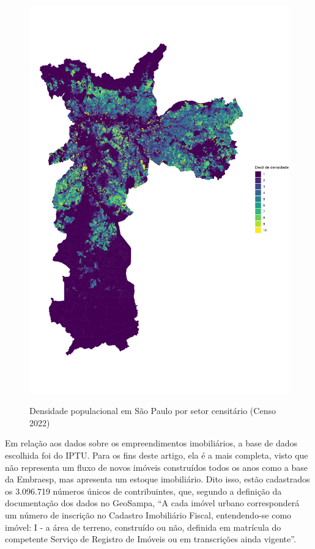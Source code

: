 \begin{figure}[h]
    \centering
    \caption{Densidade populacional em São Paulo por setor censitário (Censo 2022)}
    \includegraphics[width = \linewidth]{imagens/mapa.png}
    \label{fig:populacao}
\end{figure}

Em relação aos dados sobre os empreendimentos imobiliários, a base de dados escolhida foi do IPTU. Para os fins deste artigo, ela é a mais completa, visto que não representa um fluxo de novos imóveis construídos todos os anos como a base da Embraesp, mas apresenta um estoque imobiliário. Dito isso, estão cadastrados os 3.096.719 números únicos de contribuintes, que, segundo a definição da documentação dos dados no GeoSampa, ``A cada imóvel urbano corresponderá um número de inscrição no Cadastro Imobiliário Fiscal, entendendo-se como imóvel: I - a área de terreno, construído ou não, definida em matrícula do competente Serviço de Registro de Imóveis ou em transcrições ainda vigente''. 

